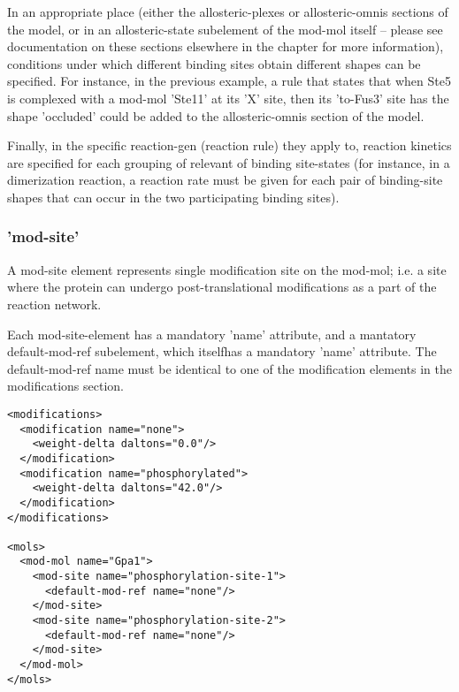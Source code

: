 In an appropriate place (either the allosteric-plexes or
allosteric-omnis sections of the model, or in an allosteric-state
subelement of the mod-mol itself -- please see documentation on these
sections elsewhere in the chapter for more information), conditions
under which different binding sites obtain different shapes can be
specified.  For instance, in the previous example, a rule that states
that when Ste5 is complexed with a mod-mol 'Ste11' at its 'X' site,
then its 'to-Fus3' site has the shape 'occluded' could be added to the
allosteric-omnis section of the model.

Finally, in the specific reaction-gen (reaction rule) they apply to,
reaction kinetics are specified for each grouping of relevant of
binding site-states (for instance, in a dimerization reaction, a
reaction rate must be given for each pair of binding-site shapes that
can occur in the two participating binding sites).  

\subsubsection{'mod-site'}
A mod-site element represents single modification site on the mod-mol;
i.e. a site where the protein can undergo post-translational 
modifications as a part of the reaction network.  

Each mod-site-element has a mandatory 'name' attribute, and a
mantatory default-mod-ref subelement, which itselfhas a mandatory 'name' attribute.
The default-mod-ref name must be identical to one of the modification elements in
the modifications section.

\lstset{language=XML}
\begin{lstlisting}[caption=Defining a modification site in a mod-mol, label=modsiteexample]
<modifications>
  <modification name="none">
    <weight-delta daltons="0.0"/>
  </modification>
  <modification name="phosphorylated">
    <weight-delta daltons="42.0"/>
  </modification>
</modifications>

<mols>
  <mod-mol name="Gpa1">
    <mod-site name="phosphorylation-site-1">
      <default-mod-ref name="none"/>
    </mod-site>
    <mod-site name="phosphorylation-site-2">
      <default-mod-ref name="none"/>
    </mod-site>
  </mod-mol>
</mols>
\end{lstlisting}

